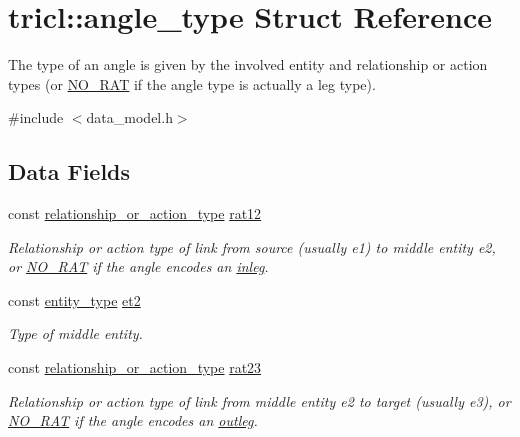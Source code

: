 \hypertarget{structtricl_1_1angle__type}{}\section{tricl\+:\+:angle\+\_\+type Struct Reference}
\label{structtricl_1_1angle__type}


The type of an angle is given by the involved entity and relationship or action types (or \hyperlink{data__model_8h_ae71ff63a5bdb6bfc09a18840c8df4e54}{N\+O\+\_\+\+R\+AT} if the angle type is actually a leg type).  




{\ttfamily \#include $<$data\+\_\+model.\+h$>$}

\subsection*{Data Fields}
\begin{DoxyCompactItemize}
\item 
\mbox{\label{structtricl_1_1angle__type_a3a134c76bb8582d630926496752bc0fd}} 
const \hyperlink{namespacetricl_a2d01894944fb58a8fedc0912a48d13f8}{relationship\+\_\+or\+\_\+action\+\_\+type} \hyperlink{structtricl_1_1angle__type_a3a134c76bb8582d630926496752bc0fd}{rat12}
\begin{DoxyCompactList}\small\item\em Relationship or action type of link from source (usually {\ttfamily e1}) to middle entity {\ttfamily e2}, or \hyperlink{data__model_8h_ae71ff63a5bdb6bfc09a18840c8df4e54}{N\+O\+\_\+\+R\+AT} if the angle encodes an \hyperlink{structtricl_1_1inleg}{inleg}. \end{DoxyCompactList}\item 
\mbox{\label{structtricl_1_1angle__type_a8d5d064234bac5aa4cd39fcec34b2fb4}} 
const \hyperlink{namespacetricl_afd4de3aedd5e48cf955f03457386e98f}{entity\+\_\+type} \hyperlink{structtricl_1_1angle__type_a8d5d064234bac5aa4cd39fcec34b2fb4}{et2}
\begin{DoxyCompactList}\small\item\em Type of middle entity. \end{DoxyCompactList}\item 
\mbox{\label{structtricl_1_1angle__type_a9a483aa66824f455a89d06a454e5b1b7}} 
const \hyperlink{namespacetricl_a2d01894944fb58a8fedc0912a48d13f8}{relationship\+\_\+or\+\_\+action\+\_\+type} \hyperlink{structtricl_1_1angle__type_a9a483aa66824f455a89d06a454e5b1b7}{rat23}
\begin{DoxyCompactList}\small\item\em Relationship or action type of link from middle entity {\ttfamily e2} to target (usually {\ttfamily e3}), or \hyperlink{data__model_8h_ae71ff63a5bdb6bfc09a18840c8df4e54}{N\+O\+\_\+\+R\+AT} if the angle encodes an \hyperlink{structtricl_1_1outleg}{outleg}. \end{DoxyCompactList}\end{DoxyCompactItemize}
